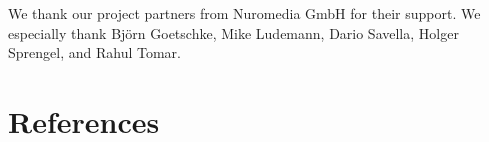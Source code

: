 \documentclass[runningheads]{llncs}
\begin{document}
We thank our project partners from Nuromedia GmbH for their support.
We especially thank Björn Goetschke, Mike Ludemann, Dario Savella, Holger Sprengel, and Rahul Tomar.


\section*{References}

%
%
% 
% 
%

\end{document}
